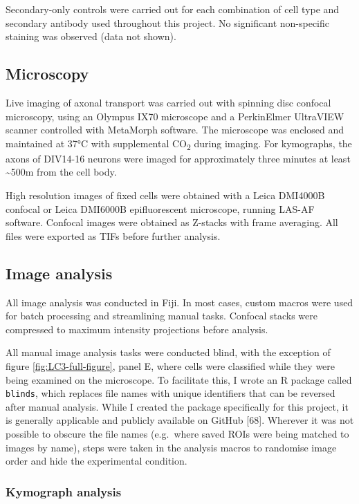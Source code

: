\documentclass[
  12pt,
  a4paper,
]{book}
\begin{document}
Secondary-only controls were carried out for each combination of cell type and secondary antibody used throughout this project. No significant non-specific staining was observed (data not shown).

\hypertarget{microscopy}{%
\subsection{Microscopy}\label{microscopy}}

Live imaging of axonal transport was carried out with spinning disc confocal microscopy, using an Olympus IX70 microscope and a PerkinElmer UltraVIEW scanner controlled with MetaMorph software. The microscope was enclosed and maintained at 37°C with supplemental CO\textsubscript{2} during imaging. For kymographs, the axons of DIV14-16 neurons were imaged for approximately three minutes at least \textasciitilde500\textmu{}m from the cell body.

High resolution images of fixed cells were obtained with a Leica DMI4000B confocal or Leica DMI6000B epifluorescent microscope, running LAS-AF software. Confocal images were obtained as Z-stacks with frame averaging. All files were exported as TIFs before further analysis.

\hypertarget{image-analysis}{%
\subsection{Image analysis}\label{image-analysis}}

All image analysis was conducted in Fiji. In most cases, custom macros were used for batch processing and streamlining manual tasks. Confocal stacks were compressed to maximum intensity projections before analysis.

All manual image analysis tasks were conducted blind, with the exception of figure \ref{fig:LC3-full-figure}, panel E, where cells were classified while they were being examined on the microscope. To facilitate this, I wrote an R package called \texttt{blinds}, which replaces file names with unique identifiers that can be reversed after manual analysis. While I created the package specifically for this project, it is generally applicable and publicly available on GitHub {[}68{]}. Wherever it was not possible to obscure the file names (e.g.~where saved ROIs were being matched to images by name), steps were taken in the analysis macros to randomise image order and hide the experimental condition.

\hypertarget{kymo}{%
\subsubsection{Kymograph analysis}\label{kymo}}
\end{document}
